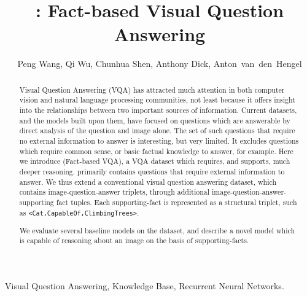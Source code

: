 \documentclass[10pt,journal]{IEEEtran}
\begin{document}
\sloppy

\title{\KBName: Fact-based Visual Question Answering }
\author{Peng Wang,
        Qi Wu,
        Chunhua Shen,
        Anthony Dick,
        Anton~van~den~Hengel
}


\maketitle



\begin{abstract}

Visual Question Answering (VQA) has attracted much attention in both computer vision and natural language processing communities, not least because it offers insight into the relationships between two important sources of information.
Current datasets, and the models built upon them, have focused on questions which are answerable by direct analysis of the question and image alone.  The set of such questions that require no external information to answer is interesting, but very limited.  It excludes questions which require common sense, or basic factual knowledge to answer, for example.
Here we introduce \KBName (Fact-based VQA), a VQA dataset which requires, and supports, much deeper reasoning.
\KBName primarily contains questions that require external information to answer.
We thus extend a conventional visual question answering dataset, which contains {image-question-answer} triplets, through additional {image-question-answer-supporting fact} tuples.
Each supporting-fact is represented as a structural triplet, such as \texttt{<Cat,CapableOf,ClimbingTrees>}.

We evaluate several baseline models on the \KBName dataset, and describe a novel model which is capable of reasoning about an image on the basis of supporting-facts.

\end{abstract}

\begin{IEEEkeywords}
  Visual Question Answering, Knowledge Base, Recurrent Neural Networks.
\end{IEEEkeywords}
\end{document}
